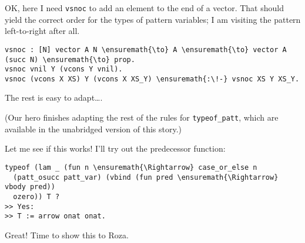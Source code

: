 OK, here I need \texttt{vsnoc} to add an element to the end of a vector.
That should yield the correct order for the types of pattern variables;
I am visiting the pattern left-to-right after all.

\begin{verbatim}
vsnoc : [N] vector A N \ensuremath{\to} A \ensuremath{\to} vector A (succ N) \ensuremath{\to} prop.
vsnoc vnil Y (vcons Y vnil).
vsnoc (vcons X XS) Y (vcons X XS_Y) \ensuremath{:\!-} vsnoc XS Y XS_Y.
\end{verbatim}

The rest is easy to adapt\ldots{}.

\begin{scenecomment}
(Our hero finishes adapting the rest of the rules for \texttt{typeof\_patt},
which are available in the unabridged version of this story.)
\end{scenecomment}

Let me see if this works! I'll try out the predecessor function:

\begin{verbatim}
typeof (lam _ (fun n \ensuremath{\Rightarrow} case_or_else n
  (patt_osucc patt_var) (vbind (fun pred \ensuremath{\Rightarrow} vbody pred))
  ozero)) T ?
>> Yes:
>> T := arrow onat onat.
\end{verbatim}

Great! Time to show this to Roza.

\identDialog
